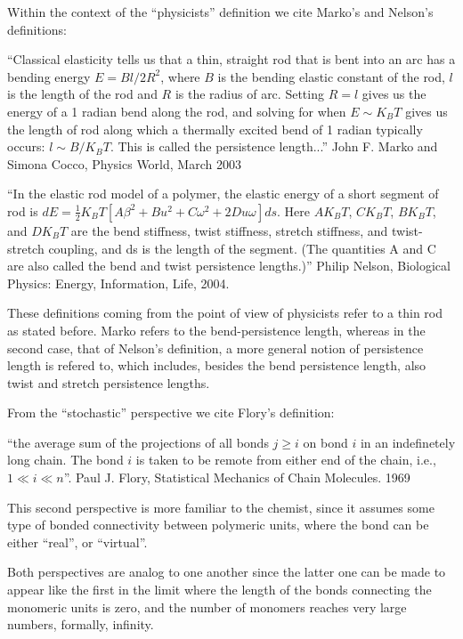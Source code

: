 Within the context of the ``physicists'' definition we cite Marko's
and Nelson's definitions:

``Classical elasticity tells us that a thin, straight rod that is bent
into an arc has a bending energy $E=Bl/2R^2$, where $B$ is the bending
elastic constant of the  rod, $l$ is the length of the  rod and $R$ is
the radius  of arc. Setting  $R=l$ gives us  the energy of a  1 radian
bend along the rod, and solving  for when $E \sim K_{B}T$ gives us the
length  of  rod along  which  a thermally  excited  bend  of 1  radian
typically occurs:  $l \sim B/K_{B}T$.  This is  called the persistence
length...'' John F. Marko and Simona Cocco, Physics World, March 2003

``In the elastic rod model of a polymer, the elastic energy of a short
segment       of       rod       is       $dE=\frac{1}{2}       K_{B}T
[A\beta^2+Bu^2+C\omega^2+2Du\omega]  ds$.  Here  $AK_{B}T$, $CK_{B}T$,
$BK_{B}T$,  and $DK_{B}T$  are  the bend  stiffness, twist  stiffness,
stretch stiffness, and twist-stretch coupling, and ds is the length of
the segment.   (The quantities A  and C are  also called the  bend and
twist  persistence  lengths.)''   Philip Nelson,  Biological  Physics:
Energy, Information, Life, 2004.

These definitions coming from the point of view of physicists refer to
a  thin rod  as stated  before. Marko  refers to  the bend-persistence
length, whereas  in the  second case, that  of Nelson's  definition, a
more  general  notion  of  persistence  length is  refered  to,  which
includes, besides the bend  persistence length, also twist and stretch
persistence lengths.

From the ``stochastic'' perspective we cite Flory's definition:

``the average sum of  the projections of all bonds $ j  \geq i$ on bond
$i$ in an indefinetely long chain.  The bond $i$ is taken to be remote
from either end of  the chain, i.e., $1 \ll i \ll  n$''. Paul J. Flory,
Statistical Mechanics of Chain Molecules. 1969

This  second perspective  is more  familiar to  the chemist,  since it
assumes  some type  of  bonded connectivity  between polymeric  units,
where the bond can be either ``real'', or ``virtual''.

Both perspectives are  analog to one another since  the latter one can
be made to appear like the first in the limit where the length of
the bonds  connecting the monomeric units  is zero, and  the number of
monomers reaches very large numbers, formally, infinity.

